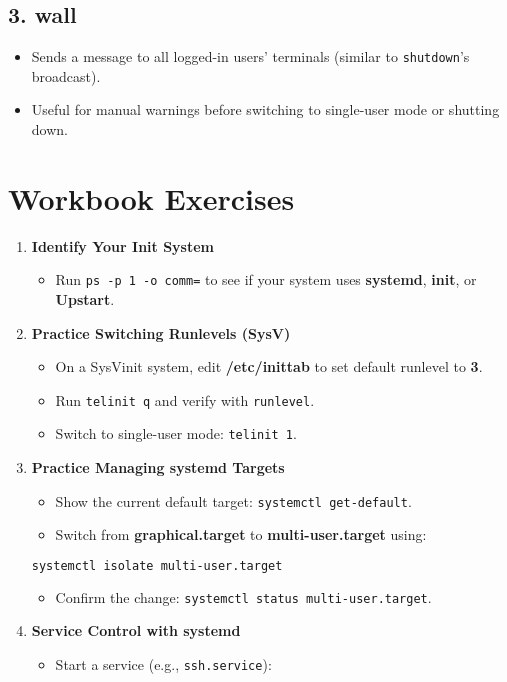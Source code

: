 \documentclass[12pt,a4paper]{report}
\begin{document}
\subsection*{3. wall}
\begin{itemize}
    \item Sends a message to all logged-in users’ terminals (similar to \texttt{shutdown}’s broadcast).
    \item Useful for manual warnings before switching to single-user mode or shutting down.
\end{itemize}

\section*{Workbook Exercises}

\begin{enumerate}
    \item \textbf{Identify Your Init System}
    \begin{itemize}
        \item Run \texttt{ps -p 1 -o comm=} to see if your system uses \textbf{systemd}, \textbf{init}, or \textbf{Upstart}.
    \end{itemize}
    \item \textbf{Practice Switching Runlevels (SysV)}
    \begin{itemize}
        \item On a SysVinit system, edit \textbf{/etc/inittab} to set default runlevel to \textbf{3}.
        \item Run \texttt{telinit q} and verify with \texttt{runlevel}.
        \item Switch to single-user mode: \texttt{telinit 1}.
    \end{itemize}
    \item \textbf{Practice Managing systemd Targets}
    \begin{itemize}
        \item Show the current default target: \texttt{systemctl get-default}.
        \item Switch from \textbf{graphical.target} to \textbf{multi-user.target} using:
\end{itemize}

\begin{lstlisting}[language=bash]
systemctl isolate multi-user.target
\end{lstlisting}

\begin{itemize}
        \item Confirm the change: \texttt{systemctl status multi-user.target}.
    \end{itemize}
    \item \textbf{Service Control with systemd}
    \begin{itemize}
        \item Start a service (e.g., \texttt{ssh.service}):
\end{itemize}


\end{enumerate}
\end{document}
